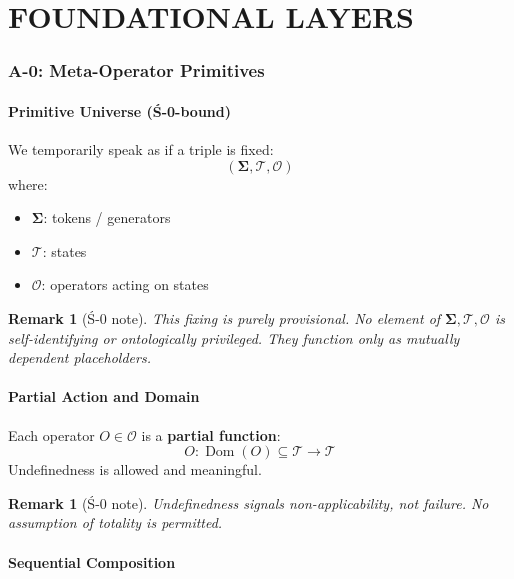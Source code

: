 \documentclass[12pt, oneside]{article}
\newtheorem{remark}[theorem]{Remark}
\newcommand{\T}{\mathcal{T}}
\newcommand{\Opr}{\mathcal{O}}
\newcommand{\Sg}{\mathbf{\Sigma}}
\begin{document}
\newpage

\part{FOUNDATIONAL LAYERS}

\section{A-0: Meta-Operator Primitives}

\subsection{Primitive Universe (Ś-0-bound)}

We temporarily speak as if a triple is fixed:
\begin{equation}
(\Sg, \T, \Opr)
\end{equation}
where:
\begin{itemize}
    \item $\Sg$: tokens / generators
    \item $\T$: states
    \item $\Opr$: operators acting on states
\end{itemize}

\begin{remark}[Ś-0 note]
This fixing is purely provisional. No element of $\Sg, \T, \Opr$ is self-identifying or ontologically privileged. They function only as mutually dependent placeholders.
\end{remark}

\subsection{Partial Action and Domain}

Each operator $O \in \Opr$ is a \textbf{partial function}:
\begin{equation}
O: \operatorname{Dom}(O) \subseteq \T \rightarrow \T
\end{equation}
Undefinedness is allowed and meaningful.

\begin{remark}[Ś-0 note]
Undefinedness signals non-applicability, not failure. No assumption of totality is permitted.
\end{remark}

\subsection{Sequential Composition}
\end{document}
